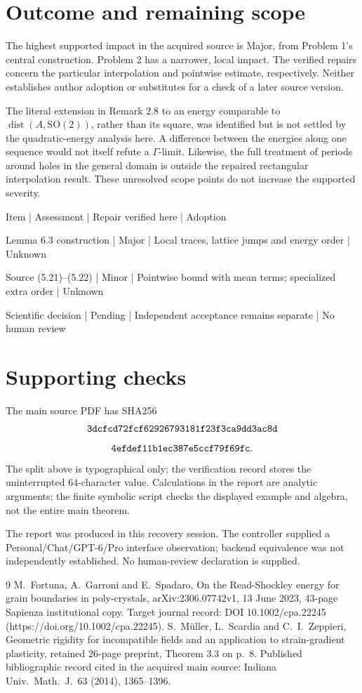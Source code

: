 \documentclass[10pt]{article}
\begin{document}
\section*{Outcome and remaining scope}
The highest supported impact in the acquired source is Major, from Problem 1’s central construction. Problem 2 has a narrower, local impact. The verified repairs concern the particular interpolation and pointwise estimate, respectively. Neither establishes author adoption or substitutes for a check of a later source version.\par
The literal extension in Remark 2.8 to an energy comparable to \(\operatorname{dist}(A,\mathrm{SO}(2))\), rather than its square, was identified but is not settled by the quadratic-energy analysis here. A difference between the energies along one sequence would not itself refute a \(\Gamma\)-limit. Likewise, the full treatment of periods around holes in the general domain is outside the repaired rectangular interpolation result. These unresolved scope points do not increase the supported severity.\par
Item | Assessment | Repair verified here | Adoption\par
Lemma 6.3 construction | Major | Local traces, lattice jumps and energy order | Unknown\par
Source (5.21)–(5.22) | Minor | Pointwise bound with mean terms; specialized extra order | Unknown\par
Scientific decision | Pending | Independent acceptance remains separate | No human review\par
\section*{Supporting checks}
The main source PDF has SHA256 \[\text{\texttt{3dcfcd72fcf62926793181f23f3ca9dd3ac8d}}\] \[\text{\texttt{4efdef11b1ec387e5ccf79f69fc}}.\] The split above is typographical only; the verification record stores the uninterrupted 64-character value. Calculations in the report are analytic arguments; the finite symbolic script checks the displayed example and algebra, not the entire main theorem.\par
The report was produced in this recovery session. The controller supplied a Personal/Chat/GPT-6/Pro interface observation; backend equivalence was not independently established. No human-review declaration is supplied.\par
9 M. Fortuna, A. Garroni and E. Spadaro, On the Read-Shockley energy for grain boundaries in poly-crystals, arXiv:2306.07742v1, 13 June 2023, 43-page Sapienza institutional copy. Target journal record: DOI 10.1002/cpa.22245 (https://doi.org/10.1002/cpa.22245). S. Müller, L. Scardia and C. I. Zeppieri, Geometric rigidity for incompatible fields and an application to strain-gradient plasticity, retained 26-page preprint, Theorem 3.3 on p. 8. Published bibliographic record cited in the acquired main source: Indiana Univ. Math. J. 63 (2014), 1365–1396.\par
\end{document}
